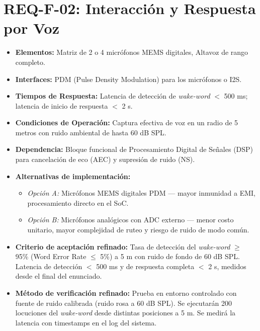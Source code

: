 \documentclass[%
	paper=a4,
	twoside=false,
	parskip=half,
	chapterprefix=false,
	10pt,
	headings=normal,
	bibliography=totoc,
	listof=totoc,
	titlepage=on,
	captions=tableabove,
	draft=false,
]{scrbook}%
\begin{document}
\section{REQ-F-02: Interacción y Respuesta por Voz}
\begin{itemize}
    \item \textbf{Elementos:} Matriz de 2 o 4 micrófonos MEMS digitales, Altavoz de rango completo.
    \item \textbf{Interfaces:} PDM (Pulse Density Modulation) para los micrófonos o I2S.
    \item \textbf{Tiempos de Respuesta:} Latencia de detección de \textit{wake-word} $<$ 500 ms; latencia de inicio de respuesta $<$ 2 s.
    \item \textbf{Condiciones de Operación:} Captura efectiva de voz en un radio de 5 metros con ruido ambiental de hasta 60 dB SPL.
    \item \textbf{Dependencia:} Bloque funcional de Procesamiento Digital de Señales (DSP) para cancelación de eco (AEC) y supresión de ruido (NS).
    \item \textbf{Alternativas de implementación:}
        \begin{itemize}
            \item \textit{Opción A:} Micrófonos MEMS digitales PDM — mayor inmunidad a EMI, procesamiento directo en el SoC.
            \item \textit{Opción B:} Micrófonos analógicos con ADC externo — menor costo unitario, mayor complejidad de ruteo y riesgo de ruido de modo común.
        \end{itemize}
    \item \textbf{Criterio de aceptación refinado:} Tasa de detección del \textit{wake-word} $\geq$ 95\% (Word Error Rate $\leq$ 5\%) a 5 m con ruido de fondo de 60 dB SPL. Latencia de detección $<$ 500 ms y de respuesta completa $<$ 2 s, medidos desde el final del enunciado.
    \item \textbf{Método de verificación refinado:} Prueba en entorno controlado con fuente de ruido calibrada (ruido rosa a 60 dB SPL). Se ejecutarán 200 locuciones del \textit{wake-word} desde distintas posiciones a 5 m. Se medirá la latencia con timestamps en el log del sistema.
\end{itemize}

\end{document}

